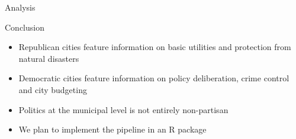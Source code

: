 \documentclass{beamer}
\begin{document}
\begin{frame}[fragile]
\begin{columns}[T]
\begin{column}{.6\textwidth}
\begin{block}{Analysis}
\begin{center}
\end{center}

\end{block}

\begin{block}{Conclusion}
\begin{itemize}
\item Republican cities feature information on basic utilities and protection from natural disasters
\item Democratic cities feature information on policy deliberation, crime control and city budgeting
\item Politics at the municipal level is not entirely non-partisan
\item We plan to implement the pipeline in an R package
\end{itemize}
\end{block}

\end{column}

\end{columns}



\end{frame}
\end{document}
